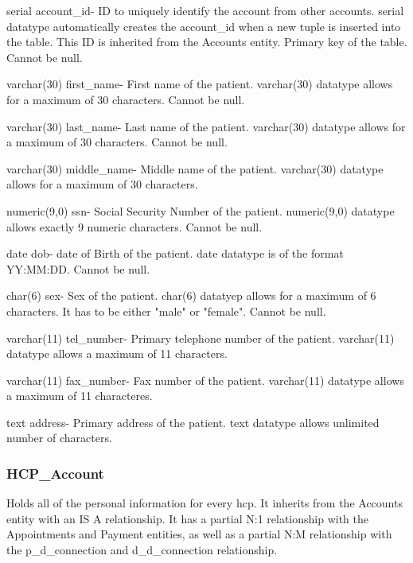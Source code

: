 \documentclass[12pt]{report}
\begin{document}
\begin{description}
\item serial account\_id- ID to uniquely identify the account from other accounts. serial datatype automatically creates the account\_id when a new tuple is inserted into the table.  This ID is inherited from the Accounts entity. Primary key of the table.  Cannot be null.
\item varchar(30) first\_name-  First name of the patient.  varchar(30) datatype allows for a maximum of 30 characters.  Cannot be null.
\item varchar(30) last\_name- Last name of the patient.  varchar(30) datatype allows for a maximum of 30 characters.  Cannot be null.
\item varchar(30) middle\_name- Middle name of the patient. varchar(30) datatype allows for a maximum of 30 characters.
\item numeric(9,0) ssn- Social Security Number of the patient. numeric(9,0) datatype allows exactly 9 numeric characters.  Cannot be null.
\item date dob- date of Birth of the patient.  date datatype is of the format YY:MM:DD.  Cannot be null.
\item char(6) sex- Sex of the patient. char(6) datatyep allows for a maximum of 6 characters.  It has to be either "male" or "female".  Cannot be null.
\item varchar(11) tel\_number- Primary telephone number of the patient.  varchar(11) datatype allows a maximum of 11 characters.
\item varchar(11) fax\_number- Fax number of the patient.  varchar(11) datatype allows a maximum of 11 characteres.
\item text address- Primary address of the patient.  text datatype allows unlimited number of characters.
\end{description}

\subsubsection{HCP\_Account}
Holds all of the personal information for every hcp.  It inherits from the Accounts entity with an IS A relationship.  It has a partial N:1 relationship with the Appointments and Payment entities, as well as a partial N:M relationship with the p\_d\_connection and d\_d\_connection relationship.
\end{document}
